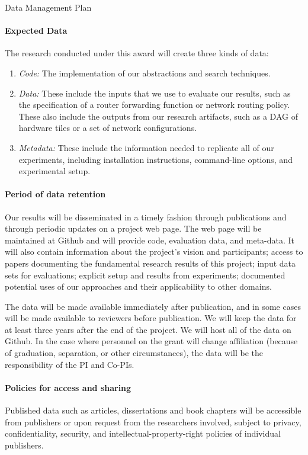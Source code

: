 \documentclass[12pt]{article}
\begin{document}
 \begin{large}
\begin{center}
Data Management Plan
\end{center}
\end{large}
\setcounter{page}{1}

\paragraph{Expected Data} The research conducted under this award will
create three kinds of data:

\begin{enumerate}
\item \textit{Code:} The implementation of our abstractions and search techniques.

\item \textit{Data:} These include the inputs that we use to evaluate our results, such as the specification of a router forwarding function or network routing policy.  These also include the outputs from our research artifacts, such as a DAG of hardware tiles or a set of network configurations.

\item \textit{Metadata:} These include the information needed to
  replicate all of our experiments, including installation instructions,
  command-line options, and experimental
  setup.
\end{enumerate}

\paragraph{Period of data retention} Our results will be disseminated in
a timely fashion through publications and through periodic updates on
a project web page. The web page will be maintained at Github and will
provide code, evaluation data, and meta-data.  It will also contain information about the project's
vision and participants; access to papers documenting the fundamental
research results of this project; input data sets for evaluations;
explicit setup and results from experiments; documented potential uses
of our approaches and their applicability to other domains. 

The data will be made available immediately after
publication, and in some cases will be made available to reviewers
before publication. We will keep the data for at least three years
after the end of the project. We will host all of the data on Github. In the case where personnel on the grant will change affiliation
(because of graduation, separation, or other circumstances), the data
will be the responsibility of the PI and Co-PIs. 

\paragraph{Policies for access and sharing} 
Published data such as articles, dissertations and book chapters will
be accessible from publishers or upon request from the researchers
involved, subject to privacy, confidentiality, security, and
intellectual-property-right policies of individual publishers.
\end{document}
